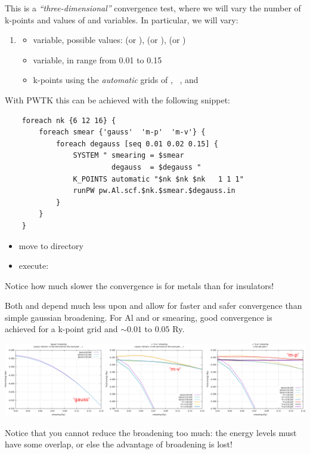 \documentclass[landscape]{foils}
\begin{document}
%
This is a {\it ``three-dimensional''} convergence test, where we will
vary the number of k-points and values of  and
 variables. In particular, we will vary:
\begin{enumerate}
\item[]
  \begin{itemize}
  \item {} variable, possible values:
     (or ),  (or
    ),  (or )
  \item {} variable, in range from 0.01 to 0.15
  \item k-points using the {\em automatic} grids of ,
    ~, and     
  \end{itemize}
\end{enumerate}
With PWTK this can be achieved with the following snippet:
{\codecolor\small
\begin{verbatim}
    foreach nk {6 12 16} {
        foreach smear {'gauss'  'm-p'  'm-v'} {
            foreach degauss [seq 0.01 0.02 0.15] {
                SYSTEM " smearing = $smear  
                         degauss  = $degauss "
                K_POINTS automatic "$nk $nk $nk   1 1 1"
                runPW pw.Al.scf.$nk.$smear.$degauss.in
            }
        }
    }
\end{verbatim}
}

%
\begin{itemize}
\item move to  directory
\item execute: ~ 
\end{itemize}
\vspace{-1em}
Notice how much slower the convergence is for metals than for insulators!

Both  and  depend much less upon  and
allow for faster and safer convergence than simple gaussian
broadening. For Al and  or  smearing, good
convergence is achieved for a  k-point grid and
 $\sim 0.01$ to $0.05$ Ry.\\[1em]
\centerline{\includegraphics[width=1.0\textwidth]{figs/smearing.pdf}}
{\small Notice that you cannot reduce the broadening too much: the energy levels
must have some overlap, or else the advantage of broadening is lost!}
\end{document}
